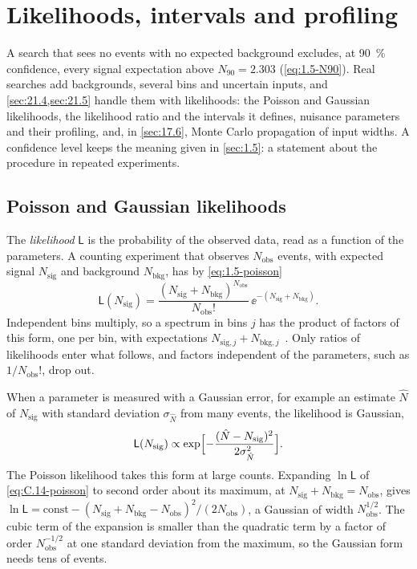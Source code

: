 \section{Likelihoods, intervals and profiling}\label{app:C.14}

A search that sees no events with no expected background excludes, at \SI{90}{\percent} confidence, every signal expectation above $N_{90} = 2.303$ (\cref{eq:1.5-N90}). Real searches add backgrounds, several bins and uncertain inputs, and \cref{sec:21.4,sec:21.5} handle them with likelihoods: the Poisson and Gaussian likelihoods, the likelihood ratio and the intervals it defines, nuisance parameters and their profiling, and, in \cref{sec:17.6}, Monte Carlo propagation of input widths. A confidence level keeps the meaning given in \cref{sec:1.5}: a statement about the procedure in repeated experiments.

\subsection{Poisson and Gaussian likelihoods}

The \emph{likelihood} $\mathsf{L}$ is the probability of the observed data, read as a function of the parameters. A counting experiment that observes $N_{\mathrm{obs}}$ events, with expected signal $N_{\mathrm{sig}}$ and background $N_{\mathrm{bkg}}$, has by \cref{eq:1.5-poisson}
\begin{equation}
  \mathsf{L}(N_{\mathrm{sig}}) = \frac{(N_{\mathrm{sig}} + N_{\mathrm{bkg}})^{N_{\mathrm{obs}}}}{N_{\mathrm{obs}}!}\,\ee^{-(N_{\mathrm{sig}} + N_{\mathrm{bkg}})} .
  \label{eq:C.14-poisson}
\end{equation}
Independent bins multiply, so a spectrum in bins $j$ has the product of factors of this form, one per bin, with expectations $N_{\mathrm{sig},j} + N_{\mathrm{bkg},j}$~\cite[Eq.~(6)]{cowan2011asymptotic}. Only ratios of likelihoods enter what follows, and factors independent of the parameters, such as $1/N_{\mathrm{obs}}!$, drop out.

When a parameter is measured with a Gaussian error, for example an estimate $\hat N$ of $N_{\mathrm{sig}}$ with standard deviation $\sigma_{\hat N}$ from many events, the likelihood is Gaussian,
\begin{equation}
  \mathsf{L}(N_{\mathrm{sig}}) \propto \exp\Bigl[-\frac{(\hat N - N_{\mathrm{sig}})^2}{2\sigma_{\hat N}^2}\Bigr] .
  \label{eq:C.14-gauss}
\end{equation}
The Poisson likelihood takes this form at large counts. Expanding $\ln\mathsf{L}$ of \cref{eq:C.14-poisson} to second order about its maximum, at $N_{\mathrm{sig}} + N_{\mathrm{bkg}} = N_{\mathrm{obs}}$, gives $\ln\mathsf{L} = \mathrm{const} - (N_{\mathrm{sig}} + N_{\mathrm{bkg}} - N_{\mathrm{obs}})^2/(2N_{\mathrm{obs}})$, a Gaussian of width $N_{\mathrm{obs}}^{1/2}$. The cubic term of the expansion is smaller than the quadratic term by a factor of order $N_{\mathrm{obs}}^{-1/2}$ at one standard deviation from the maximum, so the Gaussian form needs tens of events.

